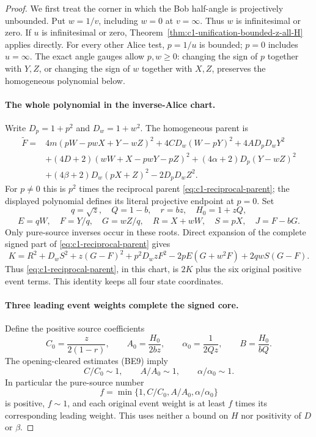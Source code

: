 \begin{proof}
We first treat the corner in which the Bob half-angle is projectively
unbounded. Put $w=1/v$, including $w=0$ at $v=\infty$.
Thus $w$ is infinitesimal or zero. If $u$ is infinitesimal or zero,
Theorem~\ref{thm:c1-unification-bounded-z-all-H} applies directly.
For every other Alice test, $p=1/u$ is bounded; $p=0$ includes
$u=\infty$. The exact angle gauges allow $p,w\ge0$: changing the
sign of $p$ together with $Y,Z$, or changing the sign of $w$ together
with $X,Z$, preserves the homogeneous polynomial below.

\paragraph{The whole polynomial in the inverse-Alice chart.}
Write $D_p=1+p^2$ and $D_w=1+w^2$. The homogeneous parent is
\[
\begin{split}
 \widetilde F={}&4m(pW-pwX+Y-wZ)^2+4CD_w(W-pY)^2
                         +4AD_pD_wY^2\\
 &+(4D+2)(wW+X-pwY-pZ)^2
 +(4\alpha+2)D_p(Y-wZ)^2\\
 &+(4\beta+2)D_w(pX+Z)^2-2D_pD_wZ^2.
\end{split}                                                    \tag{IA1}
\]
For $p\ne0$ this is $p^2$ times the reciprocal parent
\eqref{eq:c1-reciprocal-parent}; the displayed polynomial defines its
literal projective endpoint at $p=0$. Set
\[
 q=\sqrt z,\quad Q=1-b,\quad r=bz,\quad H_0=1+zQ,
\]
\[
 E=qW,\quad F=Y/q,\quad G=wZ/q,\quad
 R=X+wW,\quad S=pX,\quad J=F-bG.
\]
Only pure-source inverses occur in these roots. Direct expansion of
the complete signed part of \eqref{eq:c1-reciprocal-parent} gives
\[
 K=R^2+D_wS^2+z(G-F)^2+p^2D_wzF^2
                    -2pE(G+w^2F)+2qwS(G-F).             \tag{IA2}
\]
Thus \eqref{eq:c1-reciprocal-parent}, in this chart, is $2K$ plus
the six original positive event terms. This identity keeps all four
state coordinates.

\paragraph{Three leading event weights complete the signed core.}
Define the positive source coefficients
\[
 C_0=\frac{z}{2(1-r)},\qquad
 A_0=\frac{H_0}{2bz},\qquad
 \alpha_0=\frac1{2Qz},\qquad B=\frac{H_0}{bQ}.
\]
The opening-cleared estimates (BE9) imply
\[
 C/C_0\sim1,\qquad A/A_0\sim1,\qquad\alpha/\alpha_0\sim1.
\]
In particular the pure-source number
\[
 f=\min\{1,C/C_0,A/A_0,\alpha/\alpha_0\}
\]
is positive, $f\sim1$, and each original event weight is at least
$f$ times its corresponding leading weight. This uses neither a
bound on $H$ nor positivity of $D$ or $\beta$.


\end{proof}
